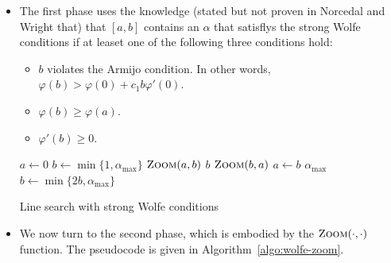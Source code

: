 \documentclass[10pt]{article}
\begin{document}
\begin{itemize}
    \item The first phase uses the knowledge (stated but not proven in Norcedal and Wright that) that $[a,b]$ contains an $\alpha$ that satisflys the strong Wolfe conditions if at leaset one of the following three conditions hold:
    \begin{itemize}
        \item $b$ violates the Armijo condition. In other words, $\varphi(b) > \varphi(0) + c_1 b \varphi'(0)$.
        \item $\varphi(b) \geq \varphi(a)$.
        \item $\varphi'(b) \geq 0$.
    \end{itemize}
    
    \begin{algorithm}[t]
        \begin{algorithmic}
            \State $a \gets 0$
            \State $b \gets \min\{1, \alpha_{\max}\}$
                    \State \Return $\Call{Zoom}{a,b}$
                \EndIf
                    \State \Return $b$
                \EndIf                
                    \State \Return $\Call{Zoom}{b,a}$
                \EndIf
                \State $a \gets b$
                    \State \Return $\alpha_{\max}$
                \EndIf
                \State $b \gets \min\{ 2b, \alpha_{\max} \}$                
            \EndWhile            
        \end{algorithmic}
        \caption{Line search with strong Wolfe conditions}
        \label{algo:interval-binary-search-with-strong-wolfe-conditions}
    \end{algorithm}

    \item We now turn to the second phase, which is embodied by the $\Call{Zoom}{\cdot, \cdot}$ function. The pseudocode is given in Algorithm~\ref{algo:wolfe-zoom}.
    

\end{itemize}
\end{document}
